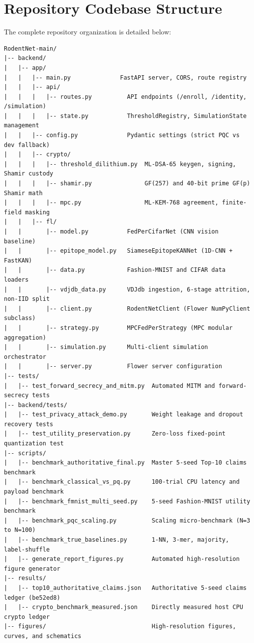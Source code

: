 \documentclass[11pt,a4paper]{report}
\begin{document}
\section{Repository Codebase Structure}
The complete repository organization is detailed below:
\begin{lstlisting}[style=code]
RodentNet-main/
|-- backend/
|   |-- app/
|   |   |-- main.py              FastAPI server, CORS, route registry
|   |   |-- api/
|   |   |   |-- routes.py          API endpoints (/enroll, /identity, /simulation)
|   |   |   |-- state.py           ThresholdRegistry, SimulationState management
|   |   |-- config.py              Pydantic settings (strict PQC vs dev fallback)
|   |   |-- crypto/
|   |   |   |-- threshold_dilithium.py  ML-DSA-65 keygen, signing, Shamir custody
|   |   |   |-- shamir.py               GF(257) and 40-bit prime GF(p) Shamir math
|   |   |   |-- mpc.py                  ML-KEM-768 agreement, finite-field masking
|   |   |-- fl/
|   |       |-- model.py           FedPerCifarNet (CNN vision baseline)
|   |       |-- epitope_model.py   SiameseEpitopeKANNet (1D-CNN + FastKAN)
|   |       |-- data.py            Fashion-MNIST and CIFAR data loaders
|   |       |-- vdjdb_data.py      VDJdb ingestion, 6-stage attrition, non-IID split
|   |       |-- client.py          RodentNetClient (Flower NumPyClient subclass)
|   |       |-- strategy.py        MPCFedPerStrategy (MPC modular aggregation)
|   |       |-- simulation.py      Multi-client simulation orchestrator
|   |       |-- server.py          Flower server configuration
|-- tests/
|   |-- test_forward_secrecy_and_mitm.py  Automated MITM and forward-secrecy tests
|-- backend/tests/
|   |-- test_privacy_attack_demo.py       Weight leakage and dropout recovery tests
|   |-- test_utility_preservation.py      Zero-loss fixed-point quantization test
|-- scripts/
|   |-- benchmark_authoritative_final.py  Master 5-seed Top-10 claims benchmark
|   |-- benchmark_classical_vs_pq.py      100-trial CPU latency and payload benchmark
|   |-- benchmark_fmnist_multi_seed.py    5-seed Fashion-MNIST utility benchmark
|   |-- benchmark_pqc_scaling.py          Scaling micro-benchmark (N=3 to N=100)
|   |-- benchmark_true_baselines.py       1-NN, 3-mer, majority, label-shuffle
|   |-- generate_report_figures.py        Automated high-resolution figure generator
|-- results/
|   |-- top10_authoritative_claims.json   Authoritative 5-seed claims ledger (be52ed8)
|   |-- crypto_benchmark_measured.json    Directly measured host CPU crypto ledger
|-- figures/                              High-resolution figures, curves, and schematics
\end{lstlisting}
\end{document}
